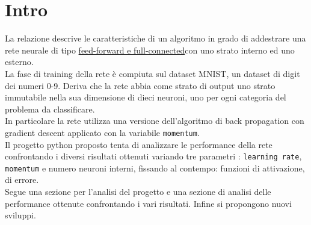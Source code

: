 \chapter{Intro}
La relazione descrive le caratteristiche di un algoritmo in grado di addestrare una rete neurale di tipo \underline{feed-forward e full-connected}\footnotemark con uno strato interno ed uno esterno. \\
La fase di training della rete è compiuta sul dataset MNIST, un dataset di digit dei numeri 0-9. Deriva che la rete abbia come strato di output uno strato immutabile nella sua dimensione di dieci neuroni, uno per ogni categoria del problema da classificare. \\
In particolare la rete utilizza una versione dell'algoritmo di back propagation con gradient descent applicato con la variabile \texttt{momentum}\footnotemark.\\
Il progetto python proposto tenta di analizzare le performance della rete confrontando i diversi risultati ottenuti variando tre parametri : \texttt{learning rate}, \texttt{momentum} e numero neuroni interni, fissando al contempo: funzioni di attivazione, di errore.\\
Segue una sezione per l'analisi del progetto e una sezione di analisi delle performance ottenute confrontando i vari risultati. Infine si propongono nuovi sviluppi.


